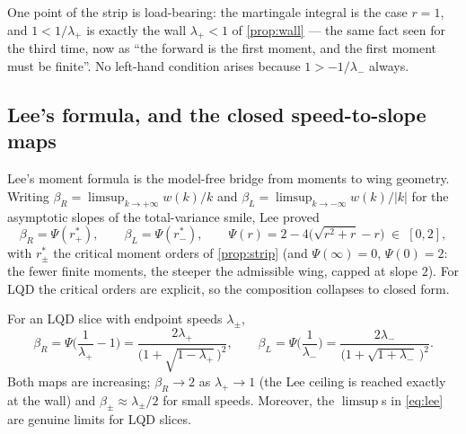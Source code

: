 One point of the strip is load-bearing: the martingale integral is the
case $r=1$, and $1<1/\lambda_+$ is exactly the wall $\lambda_+<1$ of
\cref{prop:wall} --- the same fact seen for the third time, now as ``the
forward is the first moment, and the first moment must be finite''.  No
left-hand condition arises because $1>-1/\lambda_-$ always.

\subsection{Lee's formula, and the closed speed-to-slope maps}

Lee's moment formula \citep{Lee2004} is the model-free bridge from moments
to wing geometry.  Writing $\beta_R=\limsup_{k\to+\infty}w(k)/k$ and
$\beta_L=\limsup_{k\to-\infty}w(k)/|k|$ for the asymptotic slopes of the
total-variance smile, Lee proved
\begin{equation}
\beta_R=\Psi(r_+^{*}),
\qquad
\beta_L=\Psi(r_-^{*}),
\qquad
\Psi(r)=2-4\big(\sqrt{r^{2}+r}-r\big)\;\in\;[0,2],
\label{eq:lee}
\end{equation}
with $r_\pm^{*}$ the critical moment orders of \cref{prop:strip} (and
$\Psi(\infty)=0$, $\Psi(0)=2$: the fewer finite moments, the steeper the
admissible wing, capped at slope $2$).  For LQD the critical orders are
explicit, so the composition collapses to closed form.

\begin{proposition}
\label{prop:leeclosed}
For an LQD slice with endpoint speeds $\lambda_\pm$,
\begin{equation}
\beta_R=\Psi\Big(\frac{1}{\lambda_+}-1\Big)
=\frac{2\lambda_+}{\big(1+\sqrt{1-\lambda_+}\,\big)^{2}},
\qquad
\beta_L=\Psi\Big(\frac{1}{\lambda_-}\Big)
=\frac{2\lambda_-}{\big(1+\sqrt{1+\lambda_-}\,\big)^{2}} .
\label{eq:leeclosed}
\end{equation}
Both maps are increasing; $\beta_R\to2$ as $\lambda_+\to1$ (the Lee
ceiling is reached exactly at the wall) and $\beta_\pm\approx\lambda_\pm/2$
for small speeds.  Moreover, the $\limsup$s in \eqref{eq:lee} are genuine
limits for LQD slices.
\end{proposition}

